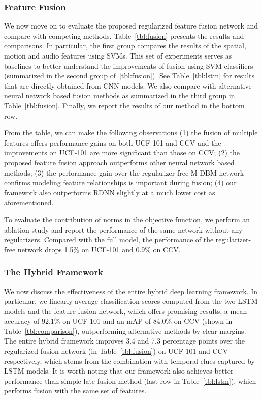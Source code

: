 \documentclass[journal]{IEEEtran}
\begin{document}
\subsubsection{Feature Fusion}
We now move on to evaluate the proposed regularized feature fusion network and compare with competing methods. Table~\ref{tbl:fusion} presents the results and comparisons. In particular, the first group compares the results of the spatial, motion and audio features using SVMs. This set of experiments serves as baselines to better understand the improvements of fusion using SVM classifiers (summarized in the second group of~\ref{tbl:fusion}). See Table~\ref{tbl:lstm} for results that are directly obtained from CNN models. We also compare with alternative neural network based fusion methods as summarized in the third group in Table~\ref{tbl:fusion}.
Finally, we report the results of our method in the bottom row.

From the table, we can make the following observations (1) the fusion of multiple features offers performance gains on both UCF-101 and CCV and the improvements on UCF-101 are more significant than those on CCV; (2) the proposed feature fusion approach outperforms other neural network based methods; (3) the performance gain over the regularizer-free M-DBM network confirms modeling feature relationships is important during fusion; (4) our framework also outperforms RDNN slightly at a much lower cost as aforementioned.

To evaluate the contribution of norms in the objective function, we perform an ablation study and report the performance of the same network without any regularizers. Compared with the full model, the performance of the regularizer-free network drops 1.5\% on UCF-101 and 0.9\% on CCV.




\subsubsection{The Hybrid Framework}
We now discuss the effectiveness of the entire hybrid deep learning framework. In particular, we linearly average classification scores computed from the two LSTM models and the feature fusion network, which offers promising results, a mean accuracy of 92.1\% on UCF-101 and an mAP of 84.0\% on CCV (shown in Table~\ref{tbl:comparison}), outperforming alternative methods by clear margins. The entire hybrid framework improves 3.4 and 7.3 percentage points over the regularized fusion network (in Table~\ref{tbl:fusion}) on UCF-101 and CCV respectively, which stems from the combination with temporal clues captured by LSTM models. It is worth noting that our framework also achieves better performance than simple late fusion method (last row in Table~\ref{tbl:lstm}), which performs fusion with the same set of features.
 
\end{document}
